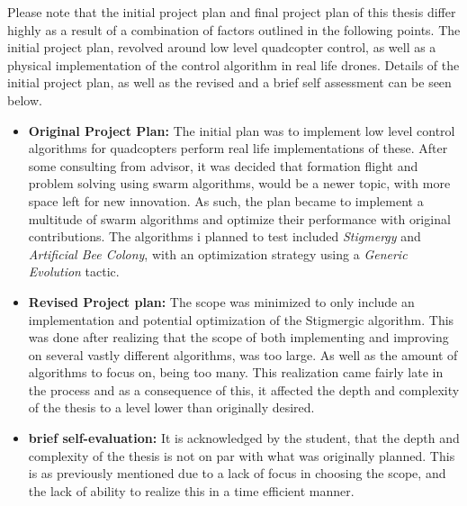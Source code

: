 Please note that the initial project plan and final project plan of this thesis differ highly as a result of a combination of factors outlined in the following points. The initial project plan, revolved around low level quadcopter control, as well as a physical implementation of the control algorithm in real life drones. Details of the initial project plan, as well as the revised and a brief self assessment can be seen below.


\begin{itemize}
\item \textbf{Original Project Plan:} The initial plan was to implement low level control algorithms for quadcopters perform real life implementations of these. After some consulting from advisor, it was decided that formation flight and problem solving using swarm algorithms, would be a newer topic, with more space left for new innovation. As such, the plan became to implement a multitude of swarm algorithms and optimize their performance with original contributions. The algorithms i planned to test included \textit{Stigmergy} and \textit{Artificial Bee Colony}, with an optimization strategy using a \textit{Generic Evolution} tactic. 

\item \textbf{Revised Project plan:} The scope was minimized to only include an implementation and potential optimization of the Stigmergic algorithm. This was done after realizing that the scope of both implementing and improving on several vastly different algorithms, was too large. As well as the amount of algorithms to focus on, being too many. This realization came fairly late in the process and as a consequence of this, it affected the depth and complexity of the thesis to a level lower than originally desired. 

\item \textbf{brief self-evaluation:} It is acknowledged by the student, that the depth and complexity of the thesis is not on par with what was originally planned. This is as previously mentioned due to a lack of focus in choosing the scope, and the lack of ability to realize this in a time efficient manner. 
\end{itemize}

